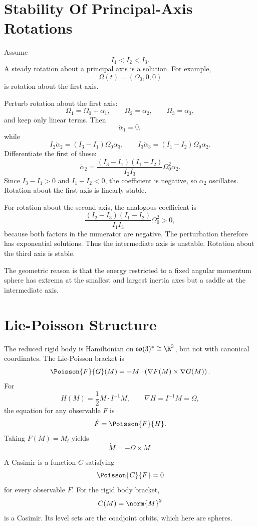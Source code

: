 \section{Stability Of Principal-Axis Rotations}
\label{sec:principal-axis-stability}

Assume
\[
  I_1<I_2<I_3.
\]
A steady rotation about a principal axis is a solution. For example,
\[
  \Omega(t)=(\Omega_0,0,0)
\]
is rotation about the first axis.

\begin{derivation}
Perturb rotation about the first axis:
\[
  \Omega_1=\Omega_0+\alpha_1,\qquad
  \Omega_2=\alpha_2,\qquad
  \Omega_3=\alpha_3,
\]
and keep only linear terms. Then
\[
  \dot\alpha_1=0,
\]
while
\[
  I_2\dot\alpha_2=(I_3-I_1)\Omega_0\alpha_3,
  \qquad
  I_3\dot\alpha_3=(I_1-I_2)\Omega_0\alpha_2.
\]
Differentiate the first of these:
\[
  \ddot\alpha_2
  =
  \frac{(I_3-I_1)(I_1-I_2)}{I_2I_3}\Omega_0^2\alpha_2.
\]
Since \(I_3-I_1>0\) and \(I_1-I_2<0\), the coefficient is negative, so
\(\alpha_2\) oscillates. Rotation about the first axis is linearly stable.

For rotation about the second axis, the analogous coefficient is
\[
  \frac{(I_2-I_3)(I_1-I_2)}{I_1I_3}\Omega_0^2>0,
\]
because both factors in the numerator are negative. The perturbation therefore
has exponential solutions. Thus the intermediate axis is unstable. Rotation
about the third axis is stable.
\end{derivation}

The geometric reason is that the energy restricted to a fixed angular momentum
sphere has extrema at the smallest and largest inertia axes but a saddle at the
intermediate axis.

\section{Lie-Poisson Structure}
\label{sec:lie-poisson-rigid-body}

The reduced rigid body is Hamiltonian on \(\mathfrak{so}(3)^*\cong\R^3\), but
not with canonical coordinates. The Lie-Poisson bracket is
\[
  \Poisson{F}{G}(M)
  =
  -M\cdot\left(\nabla F(M)\times\nabla G(M)\right).
\]
For
\[
  H(M)=\frac12M\cdot I^{-1}M,
  \qquad
  \nabla H=I^{-1}M=\Omega,
\]
the equation for any observable \(F\) is
\[
  \dot F=\Poisson{F}{H}.
\]
Taking \(F(M)=M_i\) yields
\[
  \dot M=-\Omega\times M.
\]

\begin{definition}[Casimir]
A Casimir is a function \(C\) satisfying
\[
  \Poisson{C}{F}=0
\]
for every observable \(F\). For the rigid body bracket,
\[
  C(M)=\norm{M}^2
\]
is a Casimir. Its level sets are the coadjoint orbits, which here are spheres.
\end{definition}

